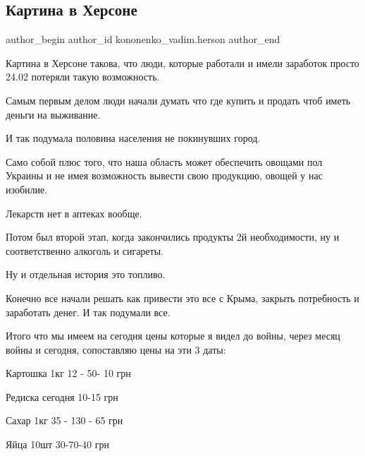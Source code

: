  
 
 
 
 
 
\subsection{Картина в Херсоне}
\label{sec:05_05_2022.fb.kononenko_vadim.herson.1.kartina_v_hersone}
 
\ifcmt
 author_begin
   author_id kononenko_vadim.herson
 author_end
\fi

Картина в Херсоне такова, что люди, которые работали и имели заработок просто
24.02 потеряли такую возможность. 

Самым первым делом люди начали думать что где купить и продать чтоб иметь
деньги на выживание. 

И так подумала половина населения не покинувших город. 

Само собой плюс того, что наша область может обеспечить овощами пол Украины и
не имея возможность вывести свою продукцию, овощей у нас изобилие.

Лекарств нет в аптеках вообще.


Потом был второй этап, когда закончились продукты 2й необходимости, ну и
соответственно алкоголь и сигареты.

Ну и отдельная история это топливо.

Конечно все начали решать как привести это все с Крыма, закрыть потребность и
заработать денег. И так подумали все.

Итого что мы имеем на сегодня цены которые я видел до войны, через месяц войны
и сегодня, сопоставляю цены на эти 3 даты:

Картошка 1кг 12 - 50- 10 грн

Редиска сегодня 10-15 грн

Сахар 1кг 35 - 130 - 65 грн

Яйца 10шт 30-70-40 грн

